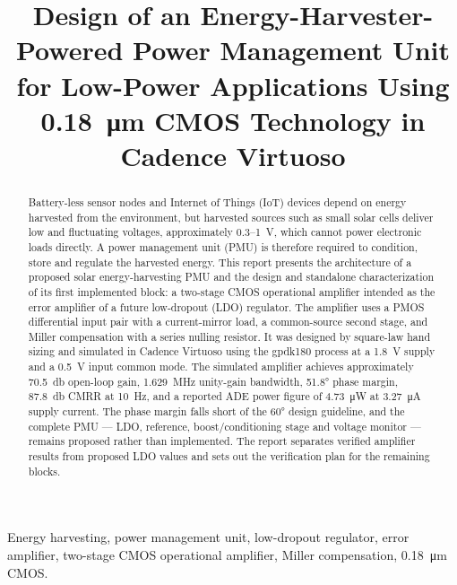 \documentclass[conference]{IEEEtran}
\begin{document}
\title{Design of an Energy-Harvester-Powered Power Management Unit for
Low-Power Applications Using 0.18~\si{\micro\metre} CMOS Technology in
Cadence Virtuoso}

\author{
}

\maketitle

\begin{abstract}
Battery-less sensor nodes and Internet of Things (IoT) devices depend on
energy harvested from the environment, but harvested sources such as small
solar cells deliver low and fluctuating voltages, approximately
0.3--1~\si{\volt}, which cannot power electronic loads directly. A power
management unit (PMU) is therefore required to condition, store and regulate
the harvested energy. This report presents the architecture of a proposed
solar energy-harvesting PMU and the design and standalone characterization of
its first implemented block: a two-stage CMOS operational amplifier intended
as the error amplifier of a future low-dropout (LDO) regulator. The amplifier
uses a PMOS differential input pair with a current-mirror load, a
common-source second stage, and Miller compensation with a series nulling
resistor. It was designed by square-law hand sizing and simulated in Cadence
Virtuoso using the gpdk180 process at a \SI{1.8}{\volt} supply and a
\SI{0.5}{\volt} input common mode. The simulated amplifier achieves
approximately \SI{70.5}{\decibel} open-loop gain, \SI{1.629}{\mega\hertz}
unity-gain bandwidth, \ang{51.8} phase margin, \SI{87.8}{\decibel} CMRR at
\SI{10}{\hertz}, and a reported ADE power figure of \SI{4.73}{\micro\watt} at
\SI{3.27}{\micro\ampere} supply current. The phase margin falls short of the
\ang{60} design guideline, and the complete PMU --- LDO, reference,
boost/conditioning stage and voltage monitor --- remains proposed rather than
implemented. The report separates verified amplifier results from proposed
LDO values and sets out the verification plan for the remaining blocks.
\end{abstract}

\begin{IEEEkeywords}
Energy harvesting, power management unit, low-dropout regulator, error
amplifier, two-stage CMOS operational amplifier, Miller compensation,
0.18~\si{\micro\metre} CMOS.
\end{IEEEkeywords}
\end{document}
